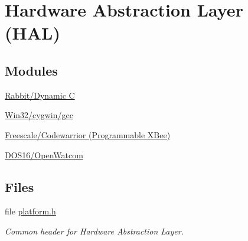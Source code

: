 \hypertarget{group__hal}{}\section{Hardware Abstraction Layer (H\+AL)}
\label{group__hal}
\subsection*{Modules}
\begin{DoxyCompactItemize}
\item 
\hyperlink{group__hal__rabbit}{Rabbit/\+Dynamic C}
\item 
\hyperlink{group__hal__win32}{Win32/cygwin/gcc}
\item 
\hyperlink{group__hal__freescale}{Freescale/\+Codewarrior (\+Programmable X\+Bee)}
\item 
\hyperlink{group__hal__dos}{D\+O\+S16/\+Open\+Watcom}
\end{DoxyCompactItemize}
\subsection*{Files}
\begin{DoxyCompactItemize}
\item 
file \hyperlink{platform_8h}{platform.\+h}
\begin{DoxyCompactList}\small\item\em Common header for Hardware Abstraction Layer. \end{DoxyCompactList}\end{DoxyCompactItemize}
